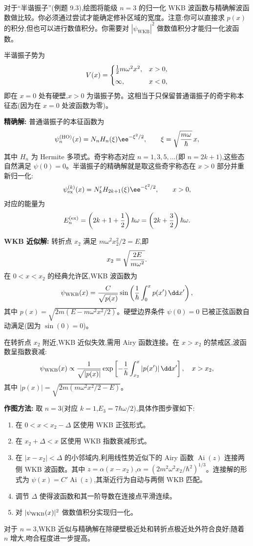 \begin{question}
对于“半谐振子”(例题 9.3),绘图将能级 $n=3$ 的归一化 WKB 波函数与精确解波函数做比较。你必须通过尝试才能确定修补区域的宽度。注意:你可以直接求 $p(x)$ 的积分,但也可以进行数值积分。你需要对 $|\psi_{\mathrm{WKB}}|^2$ 做数值积分才能归一化波函数。
\begin{solution}
半谐振子势为
\[
V(x)=\begin{cases}
{1\over2}m\omega^2x^2, & x>0,\\[4pt]
\infty, & x<0,
\end{cases}
\]
即在 $x=0$ 处有硬壁,$x>0$ 为谐振子势。这相当于只保留普通谐振子的奇宇称本征态(因为在 $x=0$ 处波函数为零)。

\textbf{精确解:} 普通谐振子的本征函数为
\[
\psi_n^{\rm (HO)}(x)=N_n H_n(\xi)\ee^{-\xi^2/2},
\qquad \xi=\sqrt{m\omega\over\hbar}\,x,
\]
其中 $H_n$ 为 Hermite 多项式。奇宇称态对应 $n=1,3,5,\ldots$(即 $n=2k+1$),这些态自然满足 $\psi(0)=0$。半谐振子的精确解就是取这些奇宇称态在 $x>0$ 部分并重新归一化:
\[
\psi_{\rm ex}^{(k)}(x)=N_k' H_{2k+1}(\xi)\ee^{-\xi^2/2},\qquad x>0,
\]
对应的能量为
\[
E_n^{\rm (ex)}=\left(2k+1+{1\over2}\right)\hbar\omega
=\left(2k+{3\over2}\right)\hbar\omega.
\]

\textbf{WKB 近似解:} 转折点 $x_2$ 满足 $m\omega^2x_2^2/2=E$,即
\[
x_2=\sqrt{2E\over m\omega^2}.
\]
在 $0<x<x_2$ 的经典允许区,WKB 波函数为
\[
\psi_{\rm WKB}(x)={C\over\sqrt{p(x)}}
\sin\left({1\over\hbar}\int_0^x p(x')\,\dd x'\right),
\]
其中 $p(x)=\sqrt{2m(E-m\omega^2x^2/2)}$。硬壁边界条件 $\psi(0)=0$ 已被正弦函数自动满足(因为 $\sin(0)=0$)。

在转折点 $x_2$ 附近,WKB 近似失效,需用 Airy 函数连接。在 $x>x_2$ 的禁戒区,波函数呈指数衰减:
\[
\psi_{\rm WKB}(x)\propto {1\over\sqrt{|p(x)|}}
\exp\left[-{1\over\hbar}\int_{x_2}^{x}|p(x')|\,\dd x'\right],
\quad x>x_2,
\]
其中 $|p(x)|=\sqrt{2m(m\omega^2x^2/2-E)}$。

\textbf{作图方法:} 取 $n=3$(对应 $k=1$,$E_3=7\hbar\omega/2$),具体作图步骤如下:
\begin{enumerate}
\item 在 $0<x<x_2-\Delta$ 区使用 WKB 正弦形式。
\item 在 $x_2+\Delta<x$ 区使用 WKB 指数衰减形式。
\item 在 $|x-x_2|<\Delta$ 的小邻域内,利用线性势近似下的 Airy 函数 $\operatorname{Ai}(z)$ 连接两侧 WKB 波函数。其中 $z=\alpha(x-x_2)$,$\alpha=(2m^2\omega^2x_2/\hbar^2)^{1/3}$。连接解的形式为 $\psi(x)=C'\operatorname{Ai}(z)$,其渐近行为自动与两侧 WKB 匹配。
\item 调节 $\Delta$ 使得波函数和其一阶导数在连接点平滑连续。
\item 对 $|\psi_{\rm WKB}(x)|^2$ 做数值积分实现归一化。
\end{enumerate}

对于 $n=3$,WKB 近似与精确解在除硬壁极近处和转折点极近处外符合良好;随着 $n$ 增大,吻合程度进一步提高。
\end{solution}
\end{question}

